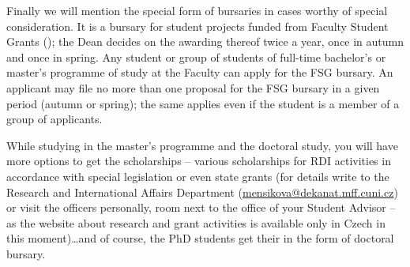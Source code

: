 Finally we will mention the special form of bursaries in cases worthy of special
consideration. It is a bursary for student projects funded from Faculty Student
Grants (); the Dean decides on the awarding thereof twice a year,
once in autumn and once in spring.
Any student or group of students of full-time bachelor’s or master’s programme
of study at the Faculty can apply for the FSG bursary. An applicant may file no
more than one proposal for the FSG bursary in a given period (autumn or spring);
the same applies even if the student is a member of a group of applicants.

While studying in the master's programme and the doctoral study, you will have
more options to get the scholarships -- various scholarships for RDI activities
in accordance with special legislation or even state grants (for details write
to the Research and International Affairs Department
(\url{mensikova@dekanat.mff.cuni.cz}) or visit the officers personally, room
next to the office of your Student Advisor -- as the website about research and
grant activities is available only in Czech in this moment)\dots and of course,
the PhD students get their  in the form of doctoral bursary.
